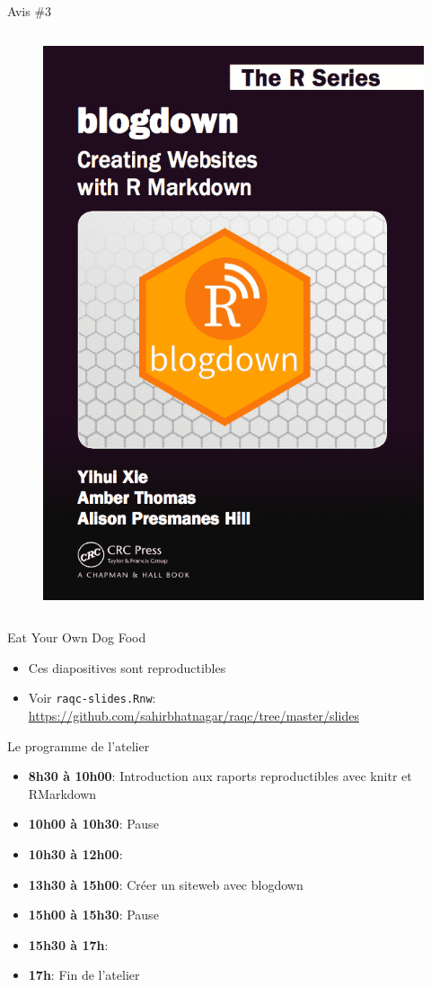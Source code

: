 \documentclass[10pt]{beamer}\usepackage[]{graphicx}\usepackage[]{color}
\begin{document}
\begin{frame}{Avis \#3}
\begin{columns}[c]
\begin{figure}
\includegraphics[width=0.6\columnwidth]{blogdown.png}
\end{figure}
\end{columns}

\end{frame}


\begin{frame}{Eat Your Own Dog Food}

\begin{itemize}
\item Ces diapositives sont reproductibles
\item Voir \texttt{raqc-slides.Rnw}: \href{https://github.com/sahirbhatnagar/raqc/tree/master/slides}{https://github.com/sahirbhatnagar/raqc/tree/master/slides}
\end{itemize}

\end{frame}



\begin{frame}{Le programme de l'atelier}
\begin{itemize}
\item \textbf{8h30 à 10h00}: Introduction aux raports reproductibles avec knitr et RMarkdown
\item \textbf{10h00 à 10h30}: Pause
\item \textbf{10h30 à 12h00}: 
\item \textbf{13h30 à 15h00}: Créer un siteweb avec blogdown
\item \textbf{15h00 à 15h30}: Pause
\item \textbf{15h30 à 17h}: 
\item \textbf{17h}: Fin de l'atelier
\end{itemize}
\end{frame}
\end{document}

